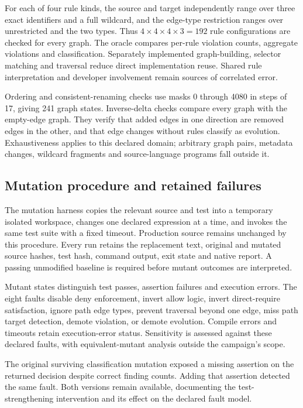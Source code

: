For each of four rule kinds, the source and target independently range over three exact identifiers and a full wildcard, and the edge-type restriction ranges over unrestricted and the two types. Thus $4\times4\times4\times3=192$ rule configurations are checked for every graph. The oracle compares per-rule violation counts, aggregate violations and classification. Separately implemented graph-building, selector matching and traversal reduce direct implementation reuse. Shared rule interpretation and developer involvement remain sources of correlated error.

Ordering and consistent-renaming checks use masks 0 through 4080 in steps of 17, giving 241 graph states. Inverse-delta checks compare every graph with the empty-edge graph. They verify that added edges in one direction are removed edges in the other, and that edge changes without rules classify as evolution. Exhaustiveness applies to this declared domain; arbitrary graph pairs, metadata changes, wildcard fragments and source-language programs fall outside it.

\subsection{Mutation procedure and retained failures}
The mutation harness copies the relevant source and test into a temporary isolated workspace, changes one declared expression at a time, and invokes the same test suite with a fixed timeout. Production source remains unchanged by this procedure. Every run retains the replacement text, original and mutated source hashes, test hash, command output, exit state and native report. A passing unmodified baseline is required before mutant outcomes are interpreted.

Mutant states distinguish test passes, assertion failures and execution errors. The eight faults disable deny enforcement, invert allow logic, invert direct-require satisfaction, ignore path edge types, prevent traversal beyond one edge, miss path target detection, demote violation, or demote evolution. Compile errors and timeouts retain execution-error status. Sensitivity is assessed against these declared faults, with equivalent-mutant analysis outside the campaign's scope.

The original surviving classification mutation exposed a missing assertion on the returned decision despite correct finding counts. Adding that assertion detected the same fault. Both versions remain available, documenting the test-strengthening intervention and its effect on the declared fault model.

